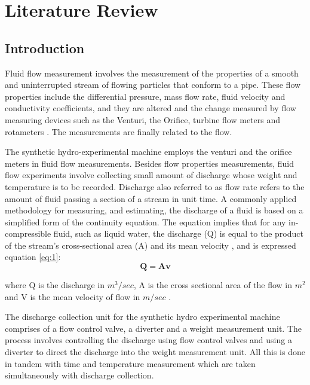 \section{Literature Review}
\label{sec:review}
\subsection{Introduction}
Fluid flow measurement involves the measurement of the properties of a smooth and uninterrupted stream of flowing particles that conform to a pipe. These flow properties include the differential pressure, mass flow rate, fluid velocity and conductivity coefficients, and they are altered and the change measured by flow measuring devices such as the Venturi, the Orifice, turbine flow meters and rotameters \cite{nandagopal2022fluid}. The measurements are finally related to the flow. 
\par
The synthetic hydro-experimental machine employs the venturi and the orifice meters in fluid flow measurements. Besides flow properties measurements, fluid flow experiments involve collecting small amount of discharge whose weight and temperature is to be recorded. Discharge also referred to as flow rate refers to the amount of fluid passing a section of a stream in unit time. A commonly applied methodology for measuring, and estimating, the discharge of a fluid is based on a simplified form of the continuity equation. The equation implies that for any in-compressible fluid, such as liquid water, the discharge (Q) is equal to the product of the stream's cross-sectional area (A) and its mean velocity \cite{davidson2018fluid}, and is expressed equation \ref{eq:1}:
\begin{equation}
\mathbf{Q}=\mathbf{A v}
\label{eq:1}
\end{equation}

where Q is the discharge in $m^{3} /{sec}$, A is the cross sectional area of the flow in ${m}^{2}$ and V is the mean velocity of flow in ${m}/{sec}$ .

\par
The discharge collection unit for the synthetic hydro experimental machine comprises of a flow control valve, a diverter and a weight measurement unit. The process involves controlling the discharge using flow control valves and using a diverter to direct the discharge into the weight measurement unit. All this is done in tandem with time and temperature measurement  which are taken simultaneously with discharge collection.



